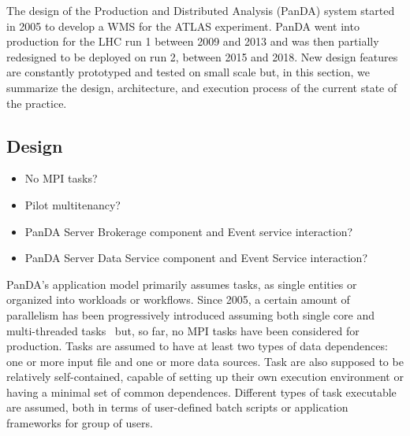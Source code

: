 
The design of the Production and Distributed Analysis (PanDA) system started in
2005 to develop a WMS for the ATLAS experiment. PanDA went into production for
the LHC run 1 between 2009 and 2013 and was then partially redesigned to be
deployed on run 2, between 2015 and 2018. New design features are constantly
prototyped and tested on small scale but, in this section, we summarize the
design, architecture, and execution process of the current state of the
practice.

\subsection{Design}


\begin{itemize}
  \item No MPI tasks?
  \item Pilot multitenancy?
  \item PanDA Server Brokerage component and Event service interaction?
  \item PanDA Server Data Service component and Event Service interaction?
\end{itemize}

PanDA's application model primarily assumes tasks, as single entities or
organized into workloads or workflows. Since 2005, a certain amount of
parallelism has been progressively introduced assuming both single core and
multi-threaded tasks~\cite{multithreaded_tasks} but, so far, no MPI tasks have
been considered for production. Tasks are assumed to have at least two types of
data dependences: one or more input file and one or more data sources. Task are
also supposed to be relatively self-contained, capable of setting up their own
execution environment or having a minimal set of common dependences. Different
types of task executable are assumed, both in terms of user-defined batch
scripts or application frameworks for group of users.

